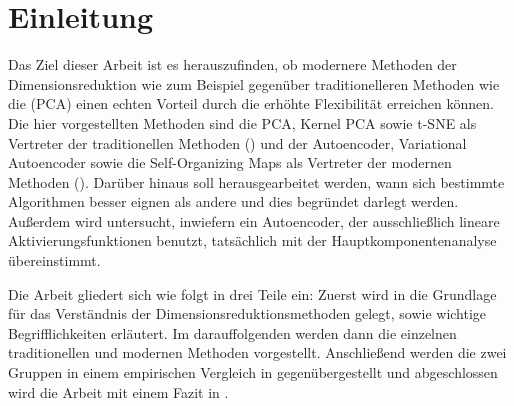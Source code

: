 \chapter{Einleitung}
\label{ch:Enleitung}


Das Ziel dieser Arbeit ist es herauszufinden, ob modernere Methoden der Dimensionsreduktion wie zum
Beispiel  gegenüber traditionelleren Methoden wie die
 (PCA) einen echten Vorteil durch die erhöhte Flexibilität
erreichen können. Die hier vorgestellten Methoden sind die PCA, Kernel PCA sowie t-SNE als Vertreter
der traditionellen Methoden () und der Autoencoder,
Variational Autoencoder sowie die Self-Organizing Maps als Vertreter der modernen Methoden
(). Darüber hinaus soll herausgearbeitet werden, wann sich
bestimmte Algorithmen besser eignen als andere und dies begründet darlegt werden. Außerdem wird
untersucht, inwiefern ein Autoencoder, der ausschließlich lineare Aktivierungsfunktionen benutzt,
tatsächlich mit der Hauptkomponentenanalyse übereinstimmt.

Die Arbeit gliedert sich wie folgt in drei Teile ein: Zuerst wird in
 die Grundlage für das Verständnis der Dimensionsreduktionsmethoden
gelegt, sowie wichtige Begrifflichkeiten erläutert. Im darauffolgenden
 werden dann die einzelnen traditionellen und modernen Methoden
vorgestellt. Anschließend werden die zwei Gruppen in einem empirischen Vergleich in
 gegenübergestellt und abgeschlossen wird die Arbeit mit einem Fazit in
.